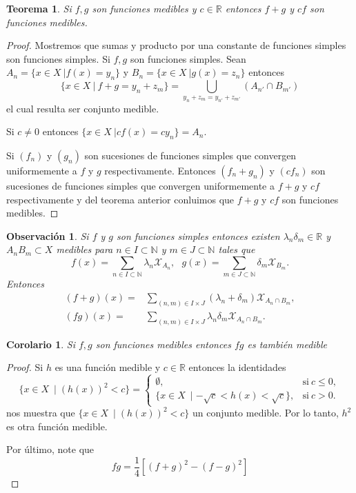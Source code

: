 \documentclass[twoside,12pt,a4 paper,openright]{book}
\newtheorem{teo}[claim]{Teorema}
\newtheorem{cor}[claim]{Corolario}
\newtheorem{ob}[claim]{Observaci\'on}
\begin{document}
\begin{teo}
    Si $f,g$ son funciones medibles y $c\in\mathbb R$ entonces $f + g$ y $cf$ son funciones medibles.
\end{teo}
\begin{proof} Mostremos  que sumas y producto por una constante de funciones simples son funciones simples.
\noindent 
   Si $f,g$ son funciones simples.  Sean 
    $A_n = \{x\in X \ | f(x) = y_n\}$ y $B_n =\{ x\in X \  | g(x) = z_n\}$ entonces 
     $$\{x \in X \ | \ f + g = y_n+z_m\} = \bigcup_{y_n + z_m = y_{n'} + z_{m'}} (A_{n'}\cap B_{m'})$$
     el cual resulta ser conjunto medible. 

\noindent 
    Si $c\neq 0$  entonces  $\{x \in X \ | cf(x) = cy_n\} = A_n$. 

\noindent
Si $(f_n)$ y $(g_n)$ son sucesiones de funciones simples que convergen uniformemente a $f$ y $g$ respectivamente. Entonces $(f_n + g_n)$ y $(cf_n)$ son sucesiones de funciones simples que convergen uniformemente a $f + g$ y $cf$ respectivamente y del teorema anterior conluimos que $f + g$ y $cf$ son funciones medibles.
\end{proof}






\begin{ob}
Si $f$ y $g$ son funciones simples entonces existen  
$ \lambda_n \delta_m \in \mathbb R $ y  ${A_n} B_m \subset X$  
medibles  para $ n\in I\subset \mathbb N$ y $ m\in J\subset \mathbb N$ tales que 
$$ f(x) = \sum_{n\in I\subset \mathbb N}  \lambda_n \mathcal X _{A_n}, \ \ \   
g(x) = \sum_{m\in J\subset \mathbb N}  \delta_m \mathcal X _{B_m}.$$  
Entonces 
\begin{align*}
(f+g)(x)=& \sum_{(n,m)\in I\times J} (\lambda_n + \delta_m)  \mathcal X _{A_n\cap B_m} , \\
(fg)(x)= & \sum_{(n,m)\in I\times J} \lambda_n  \delta_m  \mathcal X _{A_n\cap B_m}.
\end{align*}
\end{ob}


\begin{cor}
    Si $f,g$ son funciones medibles entonces $fg$ es tambi\'en medible
\end{cor}
\begin{proof} Si $h $ es una funci\'on medible y $c\in\mathbb R$ entonces la identidades
$$\{x\in X \ \mid   (h(x))^2 <c \} =  \left\{ \begin{array}{ll} \emptyset , &  \textrm{si} \ c \leq 0 , \\
   \{x\in X \ \mid   -\sqrt{c} < h(x)  < \sqrt{c} \}, & \textrm{si} \ c > 0  .     \end{array}    \right. $$
nos muestra que   $\{x\in X \ \mid   (h(x))^2 <c \}$ un conjunto  medible. Por lo tanto, $h^2$ es otra funci\'on medible.

\noindent
Por \'ultimo, note que
    $$fg = \frac{1}{4}[(f+g)^2 - (f- g)^2]$$
\end{proof}
\end{document}
